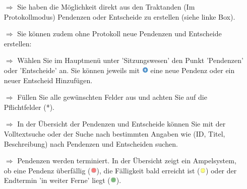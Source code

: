 \documentclass{article}
\begin{document}
\begin{multicols}{2}
\begin{tcolorbox}[colback=blue!5,colframe=blue!40!black,title=Pendenz- und Entscheid-Listen]
\begin{itemize}
  \item[$\Longrightarrow$] Sie haben die Möglichkeit direkt aus den Traktanden (Im Protokollmodus) Pendenzen oder Entscheide zu erstellen (siehe linke Box).
  \item[$\Longrightarrow$] Sie können zudem ohne Protokoll neue Pendenzen und Entscheide erstellen: 
  \item[$\Longrightarrow$] Wählen Sie im Hauptmenü unter 'Sitzungswesen' den Punkt 'Pendenzen' oder 'Entscheide' an. Sie können jeweils mit \includegraphics[height=9pt]{Icons/Plussymbol.jpg} eine neue Pendenz oder ein neuer Entscheid Hinzufügen.
  \item[$\Longrightarrow$] Füllen Sie alle gewünschten Felder aus und achten Sie auf die Pflichtfelder (*). 
	\item[$\Longrightarrow$] In der Übersicht der Pendenzen und Entscheide können Sie mit der Volltextsuche oder der Suche nach bestimmten Angaben wie (ID, Titel, Beschreibung) nach Pendenzen und Entscheiden suchen.
	\item[$\Longrightarrow$] Pendenzen werden terminiert. In der Übersicht zeigt ein Ampelsystem, ob eine Pendenz überfällig (\includegraphics[height=9pt]{Icons/PunktRot.jpg}), die Fälligkeit bald erreicht ist (\includegraphics[height=9pt]{Icons/PunktGelb.jpg}) oder der Endtermin  'in weiter Ferne' liegt (\includegraphics[height=9pt]{Icons/PunktGruen.jpg}).
\end{itemize}
\end{tcolorbox}


\end{multicols}


\end{document}
